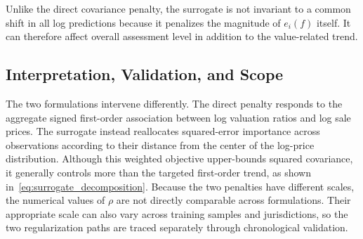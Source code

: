 \documentclass[10pt]{article}
\theoremstyle{definition}
\newcommand{\1}{\mathbf{1}}
\begin{document}
{Unlike the direct covariance penalty, the surrogate is not invariant to a common shift in all log predictions because it penalizes the magnitude of $e_i(f)$ itself. It can therefore affect overall assessment level in addition to the value-related trend. %
}


\subsection{{Interpretation, Validation, and Scope}}
\label{subsec:correction_scope}


{The two formulations intervene differently. The direct penalty responds to the aggregate signed first-order association between log valuation ratios and log sale prices. The surrogate instead reallocates squared-error importance across observations according to their distance from the center of the log-price distribution. Although this weighted objective upper-bounds squared covariance, it generally controls more than the targeted first-order trend, as shown in~\eqref{eq:surrogate_decomposition}. Because the two penalties have different scales, the numerical values of $\rho$ are not directly comparable across formulations. Their appropriate scale can also vary across training samples and jurisdictions, so the two regularization paths are traced separately through chronological validation.}

\end{document}
